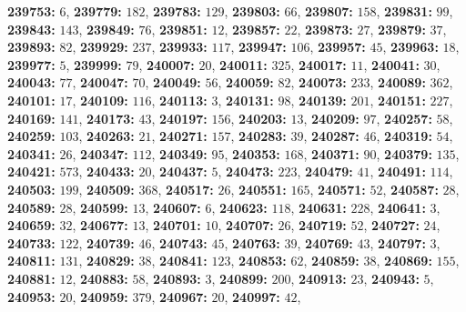 \textsf{\bfseries 239753:} $6$, \textsf{\bfseries 239779:} $182$, \textsf{\bfseries 239783:} $129$, \textsf{\bfseries 239803:} $66$, \textsf{\bfseries 239807:} $158$, \textsf{\bfseries 239831:} $99$, \textsf{\bfseries 239843:} $143$, \textsf{\bfseries 239849:} $76$, \textsf{\bfseries 239851:} $12$, \textsf{\bfseries 239857:} $22$, \textsf{\bfseries 239873:} $27$, \textsf{\bfseries 239879:} $37$, \textsf{\bfseries 239893:} $82$, \textsf{\bfseries 239929:} $237$, \textsf{\bfseries 239933:} $117$, \textsf{\bfseries 239947:} $106$, \textsf{\bfseries 239957:} $45$, \textsf{\bfseries 239963:} $18$, \textsf{\bfseries 239977:} $5$, \textsf{\bfseries 239999:} $79$, \textsf{\bfseries 240007:} $20$, \textsf{\bfseries 240011:} $325$, \textsf{\bfseries 240017:} $11$, \textsf{\bfseries 240041:} $30$, \textsf{\bfseries 240043:} $77$, \textsf{\bfseries 240047:} $70$, \textsf{\bfseries 240049:} $56$, \textsf{\bfseries 240059:} $82$, \textsf{\bfseries 240073:} $233$, \textsf{\bfseries 240089:} $362$, \textsf{\bfseries 240101:} $17$, \textsf{\bfseries 240109:} $116$, \textsf{\bfseries 240113:} $3$, \textsf{\bfseries 240131:} $98$, \textsf{\bfseries 240139:} $201$, \textsf{\bfseries 240151:} $227$, \textsf{\bfseries 240169:} $141$, \textsf{\bfseries 240173:} $43$, \textsf{\bfseries 240197:} $156$, \textsf{\bfseries 240203:} $13$, \textsf{\bfseries 240209:} $97$, \textsf{\bfseries 240257:} $58$, \textsf{\bfseries 240259:} $103$, \textsf{\bfseries 240263:} $21$, \textsf{\bfseries 240271:} $157$, \textsf{\bfseries 240283:} $39$, \textsf{\bfseries 240287:} $46$, \textsf{\bfseries 240319:} $54$, \textsf{\bfseries 240341:} $26$, \textsf{\bfseries 240347:} $112$, \textsf{\bfseries 240349:} $95$, \textsf{\bfseries 240353:} $168$, \textsf{\bfseries 240371:} $90$, \textsf{\bfseries 240379:} $135$, \textsf{\bfseries 240421:} $573$, \textsf{\bfseries 240433:} $20$, \textsf{\bfseries 240437:} $5$, \textsf{\bfseries 240473:} $223$, \textsf{\bfseries 240479:} $41$, \textsf{\bfseries 240491:} $114$, \textsf{\bfseries 240503:} $199$, \textsf{\bfseries 240509:} $368$, \textsf{\bfseries 240517:} $26$, \textsf{\bfseries 240551:} $165$, \textsf{\bfseries 240571:} $52$, \textsf{\bfseries 240587:} $28$, \textsf{\bfseries 240589:} $28$, \textsf{\bfseries 240599:} $13$, \textsf{\bfseries 240607:} $6$, \textsf{\bfseries 240623:} $118$, \textsf{\bfseries 240631:} $228$, \textsf{\bfseries 240641:} $3$, \textsf{\bfseries 240659:} $32$, \textsf{\bfseries 240677:} $13$, \textsf{\bfseries 240701:} $10$, \textsf{\bfseries 240707:} $26$, \textsf{\bfseries 240719:} $52$, \textsf{\bfseries 240727:} $24$, \textsf{\bfseries 240733:} $122$, \textsf{\bfseries 240739:} $46$, \textsf{\bfseries 240743:} $45$, \textsf{\bfseries 240763:} $39$, \textsf{\bfseries 240769:} $43$, \textsf{\bfseries 240797:} $3$, \textsf{\bfseries 240811:} $131$, \textsf{\bfseries 240829:} $38$, \textsf{\bfseries 240841:} $123$, \textsf{\bfseries 240853:} $62$, \textsf{\bfseries 240859:} $38$, \textsf{\bfseries 240869:} $155$, \textsf{\bfseries 240881:} $12$, \textsf{\bfseries 240883:} $58$, \textsf{\bfseries 240893:} $3$, \textsf{\bfseries 240899:} $200$, \textsf{\bfseries 240913:} $23$, \textsf{\bfseries 240943:} $5$, \textsf{\bfseries 240953:} $20$, \textsf{\bfseries 240959:} $379$, \textsf{\bfseries 240967:} $20$, \textsf{\bfseries 240997:} $42$, 
